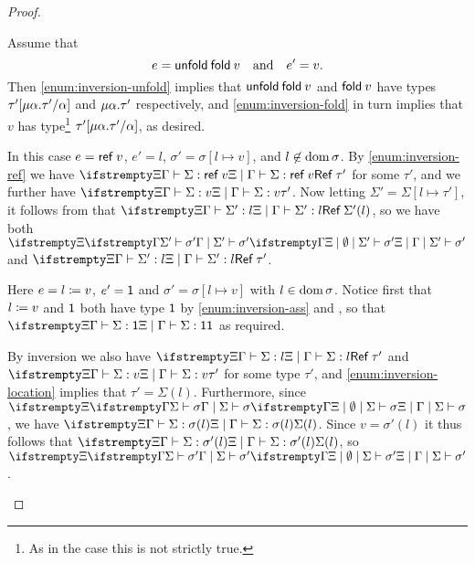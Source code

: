 \begin{proof}
\begin{proofsec}

    \item[\ruleref{Eunfoldfold}]
    Assume that
    \begin{equation*}
        e = \expUnfold{\expFold{v}}
        \quad \text{and} \quad
        e' = v.
    \end{equation*}
    Then \cref{enum:inversion-unfold} implies that $\expUnfold{\expFold{v}}$ and $\expFold{v}$ have types $\tau'[\typeRec{\alpha}{\tau'}/\alpha]$ and $\typeRec{\alpha}{\tau'}$ respectively, and \cref{enum:inversion-fold} in turn implies that $v$ has type\footnote{As in the case  this is not strictly true.} $\tau'[\typeRec{\alpha}{\tau'}/\alpha]$, as desired.

    \item[\ruleref{Ealloc}]
    In this case $e = \mathsf{ref}\: v$, $e' = l$, $\sigma' = \sigma[l \mapsto v]$, and $l \not\in \operatorname{dom} \sigma$. By \cref{enum:inversion-ref} we have $\typerel{\Xi}{\Gamma}{\Sigma}{\expRef{v}}{\typeRef{\tau'}}$ for some $\tau'$, and we further have $\typerel{\Xi}{\Gamma}{\Sigma}{v}{\tau'}$. Now letting $\Sigma' = \Sigma[l \mapsto \tau']$, it follows from  that $\typerel{\Xi}{\Gamma}{\Sigma'}{l}{\typeRef{\Sigma'(l)}}$, so we have both $\stotype{\Xi}{\Gamma}{\Sigma'}{\sigma'}$ and $\typerel{\Xi}{\Gamma}{\Sigma'}{l}{\typeRef{\tau'}}$.

    \item[\ruleref{Estore}]
    Here $e = \textcolor{black}{l} \coloneqq \textcolor{black}{v}$, $e' = \mathsf{1}$ and $\sigma' = \sigma[l \mapsto v]$ with $l \in \operatorname{dom}{\sigma}$. Notice first that $\textcolor{black}{l} \coloneqq \textcolor{black}{v}$ and $\mathsf{1}$ both have type $\mathsf{1}$ by \cref{enum:inversion-ass} and , so that $\typerel{\Xi}{\Gamma}{\Sigma}{\expUnit}{\typeUnit}$ as required.

    By inversion we also have $\typerel{\Xi}{\Gamma}{\Sigma}{l}{\typeRef{\tau'}}$ and $\typerel{\Xi}{\Gamma}{\Sigma}{v}{\tau'}$ for some type $\tau'$, and \cref{enum:inversion-location} implies that $\tau' = \Sigma(l)$. Furthermore, since $\stotype{\Xi}{\Gamma}{\Sigma}{\sigma}$, we have $\typerel{\Xi}{\Gamma}{\Sigma}{\sigma(l)}{\Sigma(l)}$. Since $v = \sigma'(l)$ it thus follows that $\typerel{\Xi}{\Gamma}{\Sigma}{\sigma'(l)}{\Sigma(l)}$, so $\stotype{\Xi}{\Gamma}{\Sigma}{\sigma'}$.


\end{proofsec}
\end{proof}
